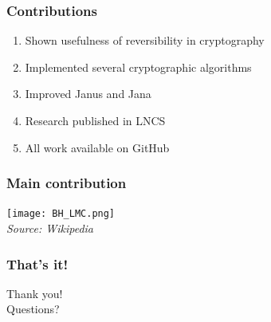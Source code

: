 \documentclass{beamer}
\begin{document}





\addtocounter{page}{1}
\begin{frame}
\addtocounter{page}{-1}
\frametitle{Contributions}

\begin{enumerate}

\item Shown usefulness of reversibility in cryptography
\item Implemented several cryptographic algorithms
\item Improved Janus and Jana
\item Research published in LNCS
\item All work available on GitHub

\end{enumerate}

\end{frame}





\addtocounter{page}{1}
\begin{frame}
\addtocounter{page}{-1}
\frametitle{Main contribution}

\pause
\begin{center}
\texttt{[image: BH\_LMC.png]}%
\\
\textit{\footnotesize{Source: Wikipedia}}
\end{center}

\end{frame}



\addtocounter{page}{1}
\begin{frame}
\addtocounter{page}{-1}
\frametitle{That's it!}
\begin{center}
Thank you!\\
Questions?
\end{center}
\end{frame}



%
\end{document}
